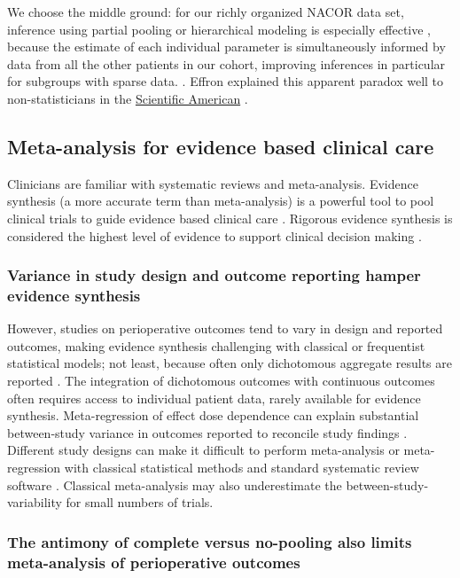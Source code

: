 \documentclass[11pt,notitlepage]{article}
\begin{document}
We choose the middle ground: for our richly organized NACOR data set, inference using partial pooling or hierarchical modeling is especially effective , because the estimate of each individual parameter is simultaneously informed by data from all the other patients in our cohort, improving inferences in particular for subgroups with sparse data. \cite{Gelman2009}. Effron explained this apparent paradox well to non-statisticians in the \href{http://www.nature.com/scientificamerican/journal/v236/n5/pdf/scientificamerican0577-119.pdf}{Scientific American} \cite{Efron_1977,Efron_1977a}. 

\subsection*{Meta-analysis for evidence based clinical care}

Clinicians are familiar with systematic reviews and meta-analysis\cite{Sackett1996}. Evidence synthesis (a more accurate term than meta-analysis) is a powerful tool to pool clinical trials to guide evidence based clinical care \cite{Ashby2000}. Rigorous evidence synthesis is considered the highest level of evidence to support clinical decision making \cite{Cook1997}. 

\subsubsection*{Variance in study design and outcome reporting hamper evidence synthesis}
However, studies on perioperative outcomes tend to vary in design and reported outcomes\cite{Andreae2013}, making evidence synthesis challenging with classical or frequentist statistical models\cite{Spiegelhalter2000}; not least, because often only dichotomous aggregate results are reported \cite{Roth2015CriticalCare}.  The integration of dichotomous outcomes with continuous outcomes often requires access to individual patient data, rarely available for evidence synthesis\cite{Andreae2015}. Meta-regression of effect dose dependence can explain substantial between-study variance in outcomes reported to reconcile study findings \cite{Andreae2015,Thompson2002,Abroug2011}. Different study designs can make it difficult to perform meta-analysis or meta-regression with classical statistical methods and standard systematic review software \cite{Deeks2011chapter}. Classical meta-analysis may also underestimate the between-study-variability for small numbers of trials\cite{Song2012,Cornell2014}.

\subsubsection*{The antimony of complete versus no-pooling also limits meta-analysis of perioperative outcomes}
\end{document}

